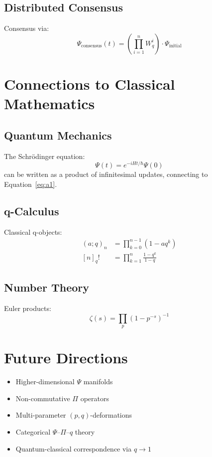 \documentclass[12pt,a4paper]{article}
\begin{document}
\subsection{Distributed Consensus}

Consensus via:
\begin{equation}
\Psi_{\text{consensus}}(t) = \left( \prod_{i=1}^{n} W_q^i \right) \cdot \Psi_{\text{initial}}
\end{equation}

\section{Connections to Classical Mathematics}

\subsection{Quantum Mechanics}

The Schrödinger equation:
\begin{equation}
\Psi(t) = e^{-iHt/\hbar} \Psi(0)
\end{equation}
can be written as a product of infinitesimal updates, connecting to Equation~\eqref{eq:a1}.

\subsection{q-Calculus}

Classical q-objects:
\begin{align}
(a;q)_n &= \prod_{k=0}^{n-1} (1 - a q^k) \\
[n]_q! &= \prod_{k=1}^{n} \frac{1 - q^k}{1 - q}
\end{align}

\subsection{Number Theory}

Euler products:
\begin{equation}
\zeta(s) = \prod_p \left(1 - p^{-s}\right)^{-1}
\end{equation}

\section{Future Directions}

\begin{itemize}
\item Higher-dimensional $\Psi$ manifolds
\item Non-commutative $\Pi$ operators
\item Multi-parameter $(p,q)$-deformations
\item Categorical $\Psi$--$\Pi$--$q$ theory
\item Quantum-classical correspondence via $q \to 1$
\end{itemize}
\end{document}
